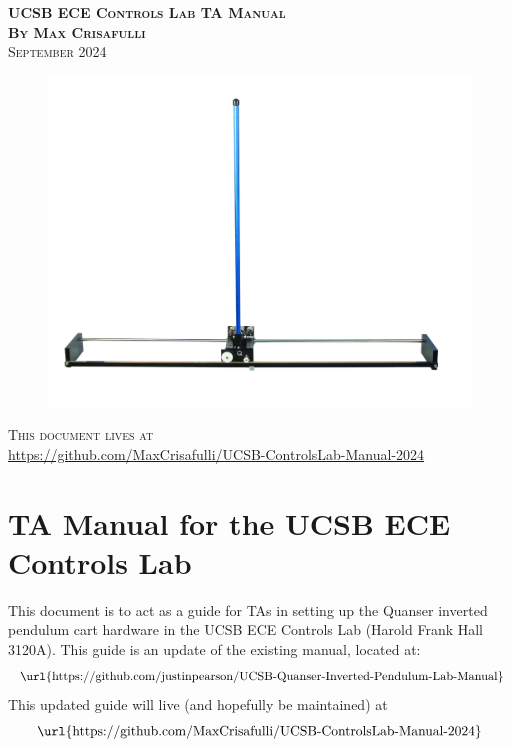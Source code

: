\documentclass[11pt,letterpaper]{article}
\begin{document}
\begin{center}
  \Huge{\textsc{\textbf{UCSB ECE Controls Lab TA Manual}}}
  \vspace{0.5cm}
  \\ \textbf{\textsc{By} \large{\textsc{Max Crisafulli}}}
  \vspace{0.2cm}
  \\ \textsc{September 2024}

  \vspace{\fill}

\begin{figure}[H]
    \centering
    \includegraphics[width=1\textwidth]{./Figures/IP02-Inverted-Pendulum_graphics.jpg}
\end{figure}

\vspace{\fill}


\textsc{This document lives at} \\
\url{https://github.com/MaxCrisafulli/UCSB-ControlsLab-Manual-2024}
\end{center}
\thispagestyle{empty}

\newpage
\phantom{}
\thispagestyle{empty}
\newpage
\setcounter{page}{1}


\section*{TA Manual for the UCSB ECE Controls Lab}
This document is to act as a guide for TAs in setting up the Quanser inverted pendulum cart hardware in the UCSB ECE Controls Lab (Harold Frank Hall 3120A). This guide is an update of the existing manual, located at:
\[ \text{ \url{https://github.com/justinpearson/UCSB-Quanser-Inverted-Pendulum-Lab-Manual}}\]
This updated guide will live (and hopefully be maintained) at 
\[\text{\url{https://github.com/MaxCrisafulli/UCSB-ControlsLab-Manual-2024}}\]
\end{document}
